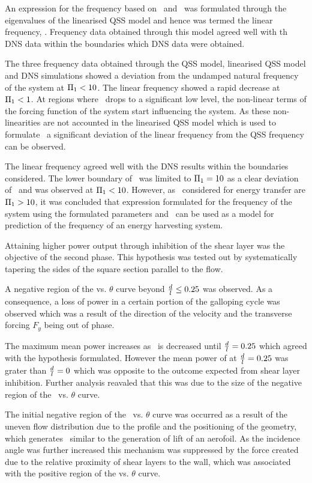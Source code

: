 An expression for the frequency based on \massstiff\ and \massdamp\ was formulated through the eigenvalues of the linearised QSS model and hence was termed the linear frequency,  \freqlin. Frequency data obtained through this model agreed well with th DNS data  within the boundaries which DNS data were obtained.  

The three frequency data obtained through the QSS model, linearised QSS model and DNS simulations showed a deviation from the undamped natural frequency of the system at $\Pi_1<10$. The linear frequency showed a rapid decrease at $\Pi_1<1$. At regions where \massstiff\ drops to a significant low level, the non-linear terms of the forcing function of the system start influencing the system. As these non-linearities are not accounted in the linearised QSS model which is used to formulate \freqlin\, a significant deviation of the linear frequency from the QSS frequency can be observed.

The linear frequency agreed well with the DNS results within the boundaries considered. The lower boundary of \massstiff\ was limited to $\Pi_1=10$ as a clear deviation of \freqlin\ and \freqdns was observed at $\Pi_1<10$. However, as \massstiff\ considered for energy transfer are $\Pi_1>10$, it was concluded that expression formulated for the frequency of the system using the formulated parameters \massstiff and \massdamp\ can be used as a model for prediction of the frequency of an energy harvesting system.  

Attaining higher power output through inhibition of the shear layer was the objective of the second phase. This hypothesis was tested out by systematically tapering the sides of the square section parallel to the flow. 

A negative region of the \cy vs. $\theta$ curve beyond $\frac{d}{l}\leq0.25$ was observed. As a consequence, a loss of power in a certain portion of the galloping cycle was observed which was a result of the direction of the velocity and the transverse forcing $F_{y}$ being out of phase. 

The maximum mean power increases as \ratio\ is decreased until $\frac{d}{l}=0.25$ which agreed with the hypothesis formulated. However the mean power of at $\frac{d}{l}=0.25$ was grater than $\frac{d}{l}=0$ which was opposite to the outcome expected from shear layer inhibition. Further analysis reavaled that this was due to the size of the negative region of the \cy\ vs. $\theta$ curve.

The initial negative region of the \cy\ vs. $\theta$ curve was occurred as a result of the uneven flow distribution due to the profile and the positioning of the geometry, which generates \cy\ similar to the generation of lift of an aerofoil. As the incidence angle was further increased this mechanism was suppressed by the force created due to the relative proximity of shear layers to the wall, which was associated with the positive region of the \cy vs. $\theta$ curve. 

